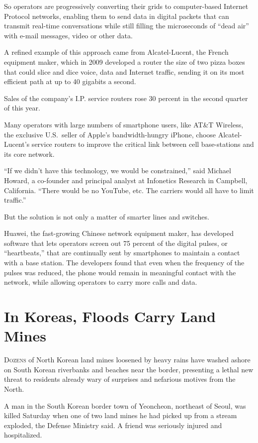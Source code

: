 ﻿\documentclass[12pt]{article}
\begin{document}
So operators are progressively converting their grids to computer-based Internet Protocol networks,
enabling them to send data in digital packets that can transmit real-time conversations while still
filling the microseconds of ``dead air'' with e-mail messages, video or other data.

A refined example of this approach came from Alcatel-Lucent, the French equipment maker, which in
2009 developed a router the size of two pizza boxes that could slice and dice voice, data and
Internet traffic, sending it on its most efficient path at up to 40 gigabits a second.

Sales of the company's I.P. service routers rose 30 percent in the second quarter of this year.

Many operators with large numbers of smartphone users, like AT\&T Wireless, the exclusive
U.S.~seller of Apple's bandwidth-hungry iPhone, choose Alcatel-Lucent's service routers to improve
the critical link between cell base-stations and its core network.

``If we didn't have this technology, we would be constrained,'' said Michael Howard, a co-founder
and principal analyst at Infonetics Research in Campbell, California. ``There would be no YouTube,
etc. The carriers would all have to limit traffic.''

But the solution is not only a matter of smarter lines and switches.

Huawei, the fast-growing Chinese network equipment maker, has developed software that lets operators
screen out 75 percent of the digital pulses, or ``heartbeats,'' that are continually sent by
smartphones to maintain a contact with a base station. The developers found that even when the
frequency of the pulses was reduced, the phone would remain in meaningful contact with the network,
while allowing operators to carry more calls and data.

\section{In Koreas, Floods Carry Land Mines}

\lettrine{D}{ozens} of North Korean land mines loosened by heavy rains have
washed ashore on South Korean riverbanks and beaches near the border, presenting a lethal new threat
to residents already wary of surprises and nefarious motives from the North.

A man in the South Korean border town of Yeoncheon, northeast of Seoul, was killed Saturday when one
of two land mines he had picked up from a stream exploded, the Defense Ministry said. A friend was
seriously injured and hospitalized.
\end{document}

